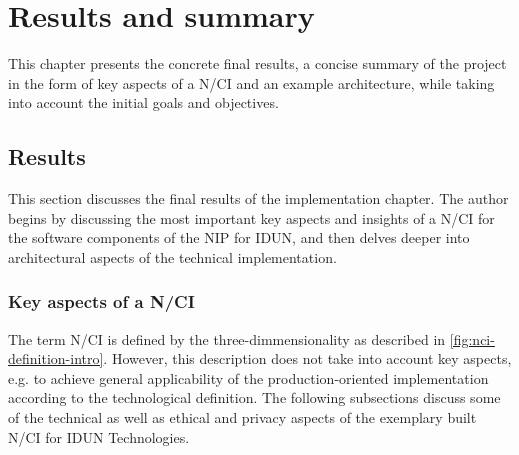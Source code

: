 \chapter{Results and summary}
\graphicspath{{Chapter5/Figs/}{Chapter5/Figs/}}

This chapter presents the concrete final results, a concise summary of the project in the form of key aspects of a N/CI and an example architecture, while taking into account the initial goals and objectives.


\section{Results}
\label{chapter5-results}

This section discusses the final results of the implementation chapter. The author begins by discussing the most important key aspects and insights of a N/CI for the software components of the NIP for IDUN, and then delves deeper into architectural aspects of the technical implementation.

\subsection{Key aspects of a N/CI}
\label{chapter5-key-aspects}

The term N/CI is defined by the three-dimmensionality as described in \autoref{fig:nci-definition-intro}. However, this description does not take into account key aspects, e.g. to achieve general applicability of the production-oriented implementation according to the technological definition. The following subsections discuss some of the technical as well as ethical and privacy aspects of the exemplary built N/CI for IDUN Technologies.

